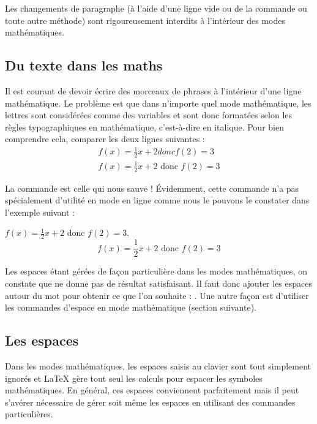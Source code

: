 \begin{info}
    Les changements de paragraphe (à l'aide d'une ligne vide ou de la commande  ou toute autre méthode) sont rigoureusement interdits à l'intérieur des modes mathématiques.
\end{info}

\subsection{Du texte dans les maths}

Il est courant de devoir écrire des morceaux de phrases à l'intérieur d'une ligne mathématique. Le problème est que dans n'importe quel mode mathématique, les lettres sont considérées comme des variables et sont donc formatées selon les règles typographiques en mathématique, c'est-à-dire en italique. Pour bien comprendre cela, comparer les deux lignes suivantes :
\[\begin{array}{c}
  	f(x) = \frac 12 x + 2 donc f(2) = 3 \\[10pt]
  	f(x) = \frac 12 x + 2 \text{ donc } f(2) = 3
  \end{array}\]

La commande  est celle qui nous sauve ! \'Evidemment, cette commande n'a pas spécialement d'utilité en mode en ligne comme nous le pouvons le constater dans l'exemple suivant :\bigskip

{\NewFont
\begin{SideBySideExample}
    $f(x) = \frac 12 x + 2$ donc $f(2) = 3$.
    \[f(x) = \frac 12 x + 2 \text{ donc } f(2) = 3\]
\end{SideBySideExample}
}\bigskip

\begin{info}
    Les espaces étant gérées de façon particulière dans les modes mathématiques, on constate que  ne donne pas de résultat satisfaisant. Il faut donc ajouter les espaces autour du mot pour obtenir ce que l'on souhaite : . Une autre façon est d'utiliser les commandes d'espace en mode mathématique (section suivante).
\end{info}

\subsection{Les espaces}
Dans les modes mathématiques, les espaces saisis au clavier sont tout simplement ignorés et \LaTeX{} gère tout seul les calculs pour espacer les symboles mathématiques. En général, ces espaces conviennent parfaitement mais il peut s'avérer nécessaire de gérer soit même les espaces en utilisant des commandes particulières.

